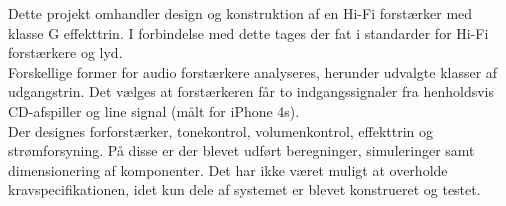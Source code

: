 Dette projekt omhandler design og konstruktion af en Hi-Fi forstærker med klasse G effekttrin. I forbindelse med dette tages der fat i standarder for Hi-Fi forstærkere og lyd.\\

Forskellige former for audio forstærkere analyseres, herunder udvalgte klasser af udgangstrin. Det vælges at forstærkeren får to indgangssignaler fra henholdsvis CD-afspiller og line signal (målt for iPhone 4s).\\

Der designes forforstærker, tonekontrol, volumenkontrol, effekttrin og strømforsyning. På disse er der blevet udført beregninger, simuleringer samt dimensionering af komponenter. Det har ikke været muligt at overholde kravspecifikationen, idet kun dele af systemet er blevet konstrueret og testet.





